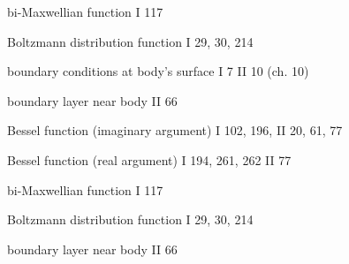 \begin{thesubjectindex}
\item bi-Maxwellian function I 117
\item Boltzmann distribution function I 29, 30, 214
\item boundary conditions at body's surface I 7 II 10 (ch. 10)
\item boundary layer near body II 66
\item Bessel function (imaginary argument) I 102, 196, II 20, 61, 77
\item Bessel function (real argument) I 194, 261, 262 II 77
\item bi-Maxwellian function I 117
\item Boltzmann distribution function I 29, 30, 214
\item boundary layer near body II 66
\end{thesubjectindex}


